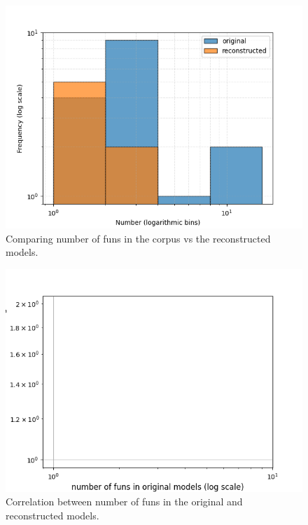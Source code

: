 \begin{figure}[htbp]
\centerline{\includegraphics[width=\linewidth]{"./Comparing number of funs in the corpus vs the reconstructed models.png"}}
\caption{Comparing number of funs in the corpus vs the reconstructed models.}
\label{fig}
\end{figure}


\begin{figure}[htbp]
\centerline{\includegraphics[width=\linewidth]{"./Correlation between number of funs in the original and reconstructed models.png"}}
\caption{Correlation between number of funs in the original and reconstructed models.}
\label{fig}
\end{figure}


